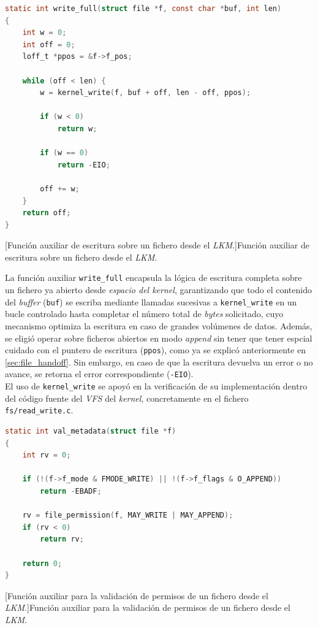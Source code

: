 \begin{lstlisting}[language=C]
static int write_full(struct file *f, const char *buf, int len)
{
    int w = 0;
    int off = 0;
    loff_t *ppos = &f->f_pos;

    while (off < len) {
        w = kernel_write(f, buf + off, len - off, ppos);

        if (w < 0)
            return w;

        if (w == 0)
            return -EIO;

        off += w;
    }
    return off;
}
\end{lstlisting}
\captionsetup{type=code,justification=centering,singlelinecheck=false}
[Función auxiliar de escritura sobre un fichero desde el \textit{LKM}.]{Función auxiliar de escritura sobre un fichero desde el \textit{LKM}.}
\label{cod:file_handoff_write_full}
\vspace{\baselineskip}

La función auxiliar \verb|write_full| encapsula la lógica de escritura completa sobre un fichero ya abierto desde \textit{espacio del kernel}, garantizando que todo el contenido del \textit{buffer} (\verb|buf|) se escriba mediante llamadas sucesivas a \verb|kernel_write| en un bucle controlado hasta completar el número total de \textit{bytes} solicitado, cuyo mecanismo optimiza la escritura en caso de grandes volúmenes de datos.
Además, se eligió operar sobre ficheros abiertos en modo \textit{append} sin tener que tener espcial cuidado con el puntero de escritura (\verb|ppos|), como ya se explicó anteriormente en \ref{sec:file_handoff}.
Sin embargo, en caso de que la escritura devuelva un error o no avance, se retorna el error correspondiente (\texttt{-EIO}).\\

El uso de \verb|kernel_write| se apoyó en la verificación de su implementación dentro del código fuente del \textit{VFS} del \textit{kernel}, concretamente en el fichero \texttt{fs/read\_write.c}.\\

\begin{lstlisting}[language=C]
static int val_metadata(struct file *f)
{
    int rv = 0;

    if (!(f->f_mode & FMODE_WRITE) || !(f->f_flags & O_APPEND))
        return -EBADF;

    rv = file_permission(f, MAY_WRITE | MAY_APPEND);
    if (rv < 0)
        return rv;

    return 0;
}
\end{lstlisting}
\captionsetup{type=code,justification=centering,singlelinecheck=false}
[Función auxiliar para la validación de permisos de un fichero desde el \textit{LKM}.]{Función auxiliar para la validación de permisos de un fichero desde el \textit{LKM}.}
\label{cod:file_handoff_val_metadata}
\vspace{\baselineskip}

